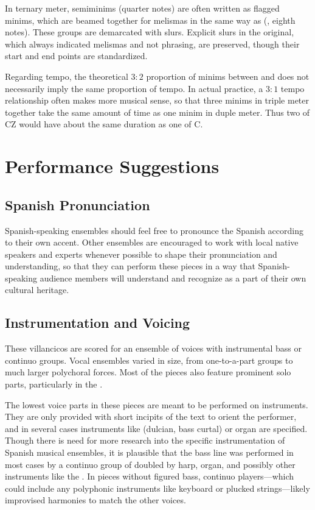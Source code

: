 In ternary meter, semiminims (quarter notes) are often written as flagged
minims, which are beamed together for melismas in the same way as
 (, eighth notes).
These groups are demarcated with slurs.
Explicit slurs in the original, which always indicated melismas and not
phrasing, are preserved, though their start and end points are standardized.

Regarding tempo, the theoretical $3:2$ proportion of minims between
\meterCThreeTwo{} and \meterC{} does not necessarily imply the same proportion of
tempo.  
In actual practice, a $3:1$ tempo relationship often makes more musical sense,
so that three minims in triple meter together take the same amount of time as
one minim in duple meter.
Thus two  of CZ would have about the same duration as one 
 of C.

\section{Performance Suggestions}

\subsection{Spanish Pronunciation}
Spanish-speaking ensembles should feel free to pronounce the Spanish according
to their own accent.
Other ensembles are encouraged to work with local native speakers and experts
whenever possible to shape their pronunciation and understanding, so that they
can perform these pieces in a way that Spanish-speaking audience members will
understand and recognize as a part of their own cultural heritage.

\subsection{Instrumentation and Voicing}
These villancicos are scored for an ensemble of voices with instrumental bass 
or continuo groups.
Vocal ensembles varied in size, from one-to-a-part groups to much larger 
polychoral forces.
Most of the pieces also feature prominent solo parts, particularly in the 
.

The lowest voice parts in these pieces are meant to be performed on instruments. 
They are only provided with short incipits of the text to orient the 
performer, and in several cases instruments like  (dulcian, bass
curtal) or organ are specified.
Though there is need for more research into the specific instrumentation of 
Spanish musical ensembles, it is plausible that the bass line was performed in 
most cases by a continuo group of  doubled by harp, organ, and 
possibly other instruments like the .%
    \Autocite
    [On the changing instrumentation in one Spanish institution, see][]
    {Torrente:PhD}
In pieces without figured bass, continuo players---which could include any
polyphonic instruments like keyboard or plucked strings---likely improvised
harmonies to match the other voices.


